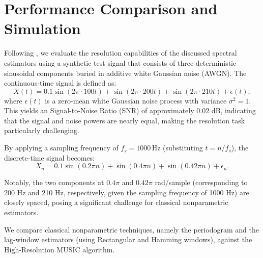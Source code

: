 \documentclass[twoside]{article}
\begin{document}
\section{Performance Comparison and Simulation}
Following \cite{MewesDermühl:2001}, we evaluate the resolution capabilities of the discussed spectral estimators using a synthetic test signal that consists of three deterministic sinusoidal components buried in additive white Gaussian noise (AWGN). The continuous-time signal is defined as:
\begin{equation}
X(t) = 0.1 \sin(2\pi \cdot 100t) + \sin(2\pi \cdot 200t) + \sin(2\pi \cdot 210t) + \epsilon(t),
\end{equation}
where $\epsilon(t)$ is a zero-mean white Gaussian noise process with variance $\sigma^2 = 1$. This yields an  Signal-to-Noise Ratio (SNR) of approximately $0.02$ dB, indicating that the signal and noise powers are nearly equal, making the resolution task particularly challenging.



By applying a sampling frequency of $f_s = 1000 \, \text{Hz}$ (substituting $t = n/f_s$), the discrete-time signal becomes:
\begin{equation}
X_n = 0.1 \sin(0.2\pi n) + \sin(0.4\pi n) + \sin(0.42\pi n) + \epsilon_n.
\end{equation}



Notably, the two components at $0.4\pi$ and $0.42\pi$ rad/sample (corresponding to 200 Hz and 210 Hz, respectively, given the sampling frequency of 1000 Hz) are closely spaced, posing a significant challenge for classical nonparametric estimators.



We compare classical nonparametric techniques, namely the periodogram and the lag-window estimators (using Rectangular and Hamming windows), against the High-Resolution MUSIC algorithm.
\end{document}
